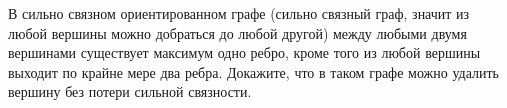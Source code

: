 В сильно связном ориентированном графе (сильно связный граф, значит из любой вершины можно добраться до
любой другой) между любыми двумя вершинами существует максимум одно ребро, кроме того из любой вершины
выходит по крайне мере два ребра. Докажите, что в таком графе можно удалить вершину без потери сильной
связности.
